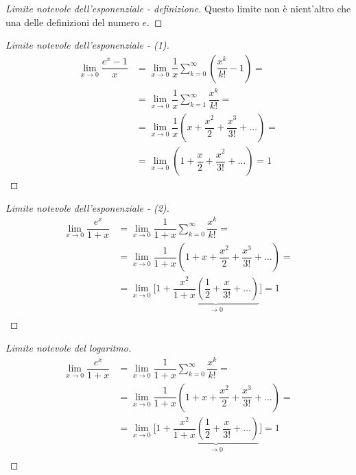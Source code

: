 \begin{proof}[Limite notevole dell'esponenziale - definizione] Questo limite non è nient'altro che una delle definizioni del numero $e$.
\end{proof}
\begin{proof}[Limite notevole dell'esponenziale - (1)]
    \begin{equation}
        \begin{aligned}
            \lim_{x \rightarrow 0} \dfrac{e^x - 1}{x} 
            & = \lim_{x \rightarrow 0} \dfrac{1}{x}\sum_{k=0}^{\infty} \left( \dfrac{x^k}{k!} - 1 \right) = \\
            & = \lim_{x \rightarrow 0} \dfrac{1}{x}\sum_{k=1}^{\infty} \dfrac{x^k}{k!} = \\
            & = \lim_{x \rightarrow 0} \dfrac{1}{x} \left( x + \dfrac{x^2}{2} + \dfrac{x^3}{3!} + \dots  \right) = \\
            & = \lim_{x \rightarrow 0} \left( 1 + \dfrac{x}{2} + \dfrac{x^2}{3!} + \dots  \right) = 1 
        \end{aligned}
    \end{equation}
\end{proof}
\begin{proof}[Limite notevole dell'esponenziale - (2)]
    \begin{equation}
        \begin{aligned}
            \lim_{x \rightarrow 0} \dfrac{e^x}{1+x} 
            & = \lim_{x \rightarrow 0} \dfrac{1}{1+x}\sum_{k=0}^{\infty} \dfrac{x^k}{k!} = \\
            & = \lim_{x \rightarrow 0} \dfrac{1}{1+x}\left( 1 + x + \dfrac{x^2}{2} + \dfrac{x^3}{3!} + \dots \right) = \\
            & = \lim_{x \rightarrow 0} \bigg[ 1 + \underbrace{\dfrac{x^2}{1+x} \left( \dfrac{1}{2} + \dfrac{x}{3!} + \dots \right)}_{\rightarrow 0} \bigg] = 1 \\
        \end{aligned}
    \end{equation}
\end{proof}
\begin{proof}[Limite notevole del logaritmo]
    \begin{equation}
        \begin{aligned}
            \lim_{x \rightarrow 0} \dfrac{e^x}{1+x} 
            & = \lim_{x \rightarrow 0} \dfrac{1}{1+x}\sum_{k=0}^{\infty} \dfrac{x^k}{k!} = \\
            & = \lim_{x \rightarrow 0} \dfrac{1}{1+x}\left( 1 + x + \dfrac{x^2}{2} + \dfrac{x^3}{3!} + \dots \right) = \\
            & = \lim_{x \rightarrow 0} \bigg[ 1 + \underbrace{\dfrac{x^2}{1+x} \left( \dfrac{1}{2} + \dfrac{x}{3!} + \dots \right)}_{\rightarrow 0} \bigg] = 1 \\
        \end{aligned}
    \end{equation}
\end{proof}

